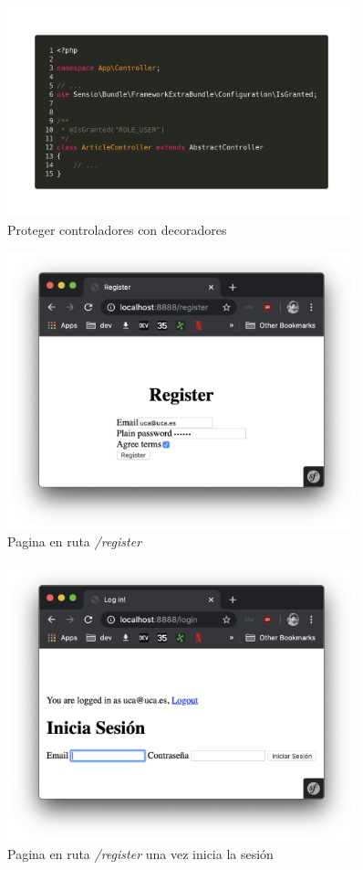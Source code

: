\begin{figure}[ht]
  \centering
  \includegraphics[width=0.9\textwidth]{../assets/role_granted.png}
  \caption{Proteger controladores con decoradores}
  \label{fig:role_granted}
\end{figure}

\begin{figure}[ht]
  \centering
  \includegraphics[width=0.9\textwidth]{../assets/register_page_uca.png}
  \caption{Pagina en ruta \textit{/register}}
  \label{fig:register_page_uca}
\end{figure}

\begin{figure}[ht]
  \centering
  \includegraphics[width=0.9\textwidth]{../assets/logout.png}
  \caption{Pagina en ruta \textit{/register} una vez inicia la sesión}
  \label{fig:logout}
\end{figure}